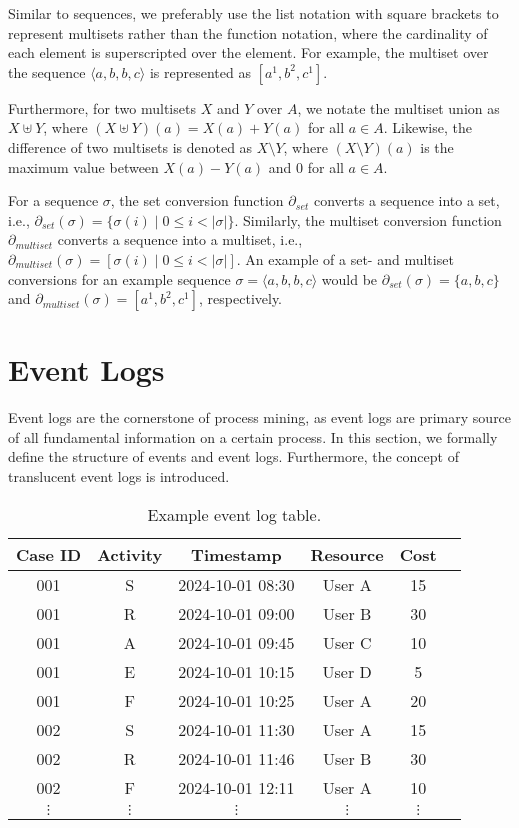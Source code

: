 Similar to sequences, we preferably use the list notation with square brackets to represent multisets rather than the function notation, where the cardinality of each element is superscripted over the element. For example, the multiset over the sequence $\langle a, b, b, c \rangle$ is represented as $[a^1, b^2, c^1]$.

Furthermore, for two multisets $X$ and $Y$ over $A$, we notate the multiset union as $X \uplus Y$, where $(X \uplus Y)(a) = X(a) + Y(a)$ for all $a \in A$. Likewise, the difference of two multisets is denoted as $X \setminus Y$, where $(X \setminus Y)(a)$ is the maximum value between $X(a) - Y(a)$ and $0$ for all $a \in A$.

For a sequence $\sigma$, the set conversion function $\partial_{set}$ converts a sequence into a set, i.e., $\partial_{set}(\sigma) = \{ \sigma(i) \mid 0 \leq i < \lvert \sigma \rvert \}$. Similarly, the multiset conversion function $\partial_{multiset}$ converts a sequence into a multiset, i.e., $\partial_{multiset}(\sigma) = [\sigma(i) \mid 0 \leq i < \lvert \sigma \rvert ]$. An example of a set- and multiset conversions for an example sequence $\sigma = \langle a, b, b, c \rangle$ would be $\partial_{set}(\sigma) = \{ a, b, c \}$ and $\partial_{multiset}(\sigma) = [a^1, b^2, c^1]$, respectively.

\section{Event Logs}

Event logs are the cornerstone of process mining, as event logs are primary source of all fundamental information on a certain process. In this section, we formally define the structure of events and event logs. Furthermore, the concept of translucent event logs is introduced.

\begin{table}[h]
    \centering
    \caption{Example event log table.}
    \begin{tabular}{|c|c|c|c|c|c|}
        \hline
        \textbf{Case ID} & \textbf{Activity} & \textbf{Timestamp} & \textbf{Resource} & \textbf{Cost} \\ 
        \hline
        001 & S  & 2024-10-01 08:30 & User A & 15 \\ 
        001 & R    & 2024-10-01 09:00 & User B & 30 \\ 
        001 & A & 2024-10-01 09:45 & User C & 10 \\ 
        001 & E     & 2024-10-01 10:15 & User D & 5  \\ 
        001 & F & 2024-10-01 10:25 & User A & 20 \\
        002 & S  & 2024-10-01 11:30 & User A & 15\\ 
        002 & R    & 2024-10-01 11:46 & User B & 30\\ 
        002 & F & 2024-10-01 12:11 & User A & 10\\ 
        $\vdots$ & $\vdots$ & $\vdots$ & $\vdots$ & $\vdots$\\
        \hline
    \end{tabular}
    \label{tab:event-log}
\end{table}

